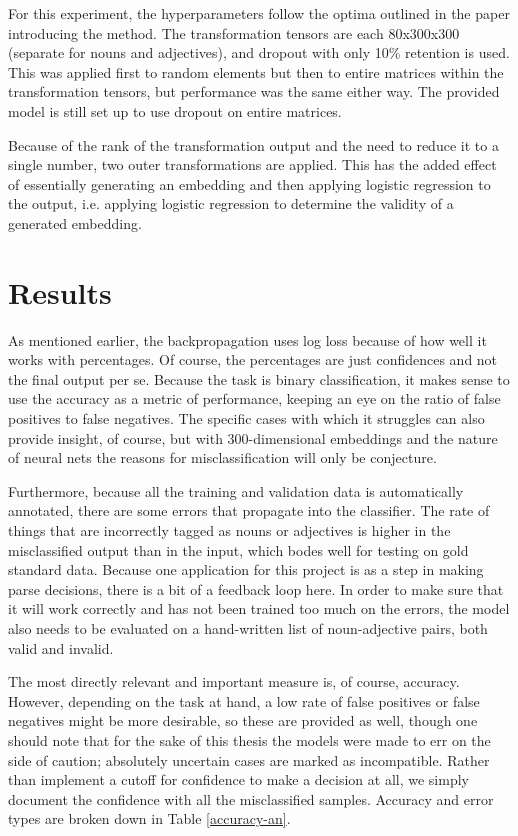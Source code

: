 \documentclass[a4paper, 11pt]{scrartcl}
\begin{document}
For this experiment, the hyperparameters follow the optima outlined in the paper introducing the method. The transformation tensors are each 80x300x300 (separate for nouns and adjectives), and dropout with only 10\% retention is used. This was applied first to random elements but then to entire matrices within the transformation tensors, but performance was the same either way. The provided model is still set up to use dropout on entire matrices.

Because of the rank of the transformation output and the need to reduce it to a single number, two outer transformations are applied. This has the added effect of essentially generating an embedding and then applying logistic regression to the output, i.e. applying logistic regression to determine the validity of a generated embedding.


\section{Results}

As mentioned earlier, the backpropagation uses log loss because of how well it works with percentages. Of course, the percentages are just confidences and not the final output per se. Because the task is binary classification, it makes sense to use the accuracy as a metric of performance, keeping an eye on the ratio of false positives to false negatives. The specific cases with which it struggles can also provide insight, of course, but with 300-dimensional embeddings and the nature of neural nets the reasons for misclassification will only be conjecture.

Furthermore, because all the training and validation data is automatically annotated, there are some errors that propagate into the classifier. The rate of things that are incorrectly tagged as nouns or adjectives is higher in the misclassified output than in the input, which bodes well for testing on gold standard data. Because one application for this project is as a step in making parse decisions, there is a bit of a feedback loop here. In order to make sure that it will work correctly and has not been trained too much on the errors, the model also needs to be evaluated on a hand-written list of noun-adjective pairs, both valid and invalid.

The most directly relevant and important measure is, of course, accuracy. However, depending on the task at hand, a low rate of false positives or false negatives might be more desirable, so these are provided as well, though one should note that for the sake of this thesis the models were made to err on the side of caution; absolutely uncertain cases are marked as incompatible. Rather than implement a cutoff for confidence to make a decision at all, we simply document the confidence with all the misclassified samples. Accuracy and error types are broken down in Table \ref{accuracy-an}.
\end{document}
